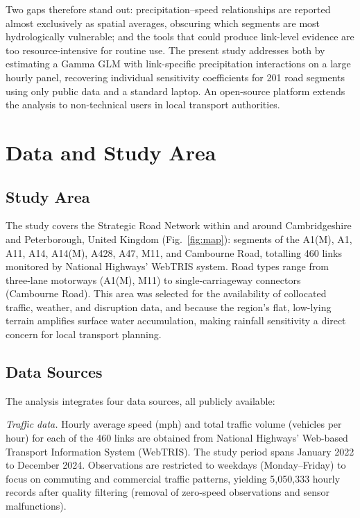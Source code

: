 \documentclass[review,authoryear]{elsarticle}
\begin{document}
Two gaps therefore stand out: precipitation--speed relationships are reported almost exclusively as spatial averages, obscuring which segments are most hydrologically vulnerable; and the tools that could produce link-level evidence are too resource-intensive for routine use. The present study addresses both by estimating a Gamma GLM with link-specific precipitation interactions on a large hourly panel, recovering individual sensitivity coefficients for 201 road segments using only public data and a standard laptop. An open-source platform extends the analysis to non-technical users in local transport authorities.


\section{Data and Study Area}
\label{sec:data}

\subsection{Study Area}
\label{sec:data:area}

The study covers the Strategic Road Network within and around Cambridgeshire and Peterborough, United Kingdom (Fig.~\ref{fig:map}): segments of the A1(M), A1, A11, A14, A14(M), A428, A47, M11, and Cambourne Road, totalling 460 links monitored by National Highways' WebTRIS system. Road types range from three-lane motorways (A1(M), M11) to single-carriageway connectors (Cambourne Road). This area was selected for the availability of collocated traffic, weather, and disruption data, and because the region's flat, low-lying terrain amplifies surface water accumulation, making rainfall sensitivity a direct concern for local transport planning.

\subsection{Data Sources}
\label{sec:data:sources}

The analysis integrates four data sources, all publicly available:

\textit{Traffic data.} Hourly average speed (\si{mph}) and total traffic volume (vehicles per hour) for each of the 460 links are obtained from National Highways' Web-based Transport Information System (WebTRIS). The study period spans January 2022 to December 2024. Observations are restricted to weekdays (Monday--Friday) to focus on commuting and commercial traffic patterns, yielding 5,050,333 hourly records after quality filtering (removal of zero-speed observations and sensor malfunctions).
\end{document}
